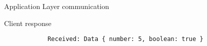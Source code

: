 \begin{frame}[fragile]{Application Layer communication}
    \begin{alertblock}{Client response}
        \begin{verbatim}
            Received: Data { number: 5, boolean: true }
        \end{verbatim}
    \end{alertblock}

\end{frame}
